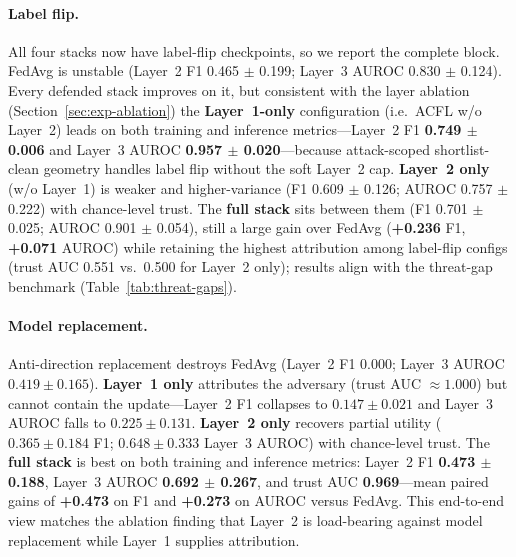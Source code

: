 \paragraph{Label flip.}
All four stacks now have label-flip checkpoints, so we report the complete block.
FedAvg is unstable (Layer~2 F1 0.465 $\pm$ 0.199; Layer~3 AUROC 0.830 $\pm$ 0.124).
Every defended stack improves on it, but consistent with the layer ablation (Section~\ref{sec:exp-ablation}) the \textbf{Layer~1-only} configuration (i.e.\ ACFL w/o Layer~2) leads on both training and inference metrics---Layer~2 F1 \textbf{0.749 $\pm$ 0.006} and Layer~3 AUROC \textbf{0.957 $\pm$ 0.020}---because attack-scoped shortlist-clean geometry handles label flip without the soft Layer~2 cap.
\textbf{Layer~2 only} (w/o Layer~1) is weaker and higher-variance (F1 0.609 $\pm$ 0.126; AUROC 0.757 $\pm$ 0.222) with chance-level trust.
The \textbf{full stack} sits between them (F1 0.701 $\pm$ 0.025; AUROC 0.901 $\pm$ 0.054), still a large gain over FedAvg (\textbf{+0.236} F1, \textbf{+0.071} AUROC) while retaining the highest attribution among label-flip configs (trust AUC 0.551 vs.\ 0.500 for Layer~2 only); results align with the threat-gap benchmark (Table~\ref{tab:threat-gaps}).

\paragraph{Model replacement.}
Anti-direction replacement destroys FedAvg (Layer~2 F1 $0.000$; Layer~3 AUROC $0.419 \pm 0.165$).
\textbf{Layer~1 only} attributes the adversary (trust AUC $\approx 1.000$) but cannot contain the update---Layer~2 F1 collapses to $0.147 \pm 0.021$ and Layer~3 AUROC falls to $0.225 \pm 0.131$.
\textbf{Layer~2 only} recovers partial utility ($0.365 \pm 0.184$ F1; $0.648 \pm 0.333$ Layer~3 AUROC) with chance-level trust.
The \textbf{full stack} is best on both training and inference metrics: Layer~2 F1 \textbf{0.473 $\pm$ 0.188}, Layer~3 AUROC \textbf{0.692 $\pm$ 0.267}, and trust AUC \textbf{0.969}---mean paired gains of \textbf{+0.473} on F1 and \textbf{+0.273} on AUROC versus FedAvg.
This end-to-end view matches the ablation finding that Layer~2 is load-bearing against model replacement while Layer~1 supplies attribution.

